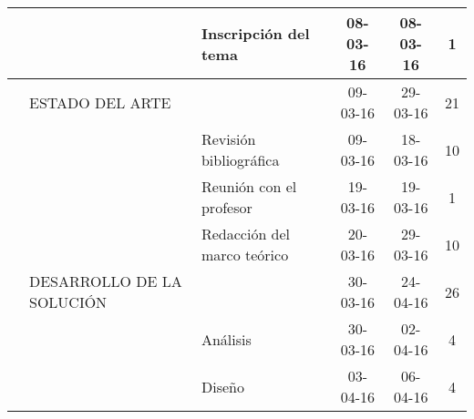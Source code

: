 \begin{table}[H]
{\begin{tabular}{lllccc}
     &                               & Inscripción del tema                               & 08-03-16                                                           & 08-03-16                                                            & 1                                                                  \\ \hline
     & ESTADO DEL ARTE               &                                                    & 09-03-16                                                           & 29-03-16                                                            & 21                                                                 \\
     &                               & Revisión bibliográfica                             & 09-03-16                                                           & 18-03-16                                                            & 10                                                                 \\
     &                               & Reunión con el profesor                            & 19-03-16                                                           & 19-03-16                                                            & 1                                                                  \\
     &                               & Redacción del marco teórico                        & 20-03-16                                                           & 29-03-16                                                            & 10                                                                 \\ \hline
     & DESARROLLO DE LA SOLUCIÓN     &                                                    & 30-03-16                                                           & 24-04-16                                                            & 26                                                                 \\
     &                               & Análisis                                           & 30-03-16                                                           & 02-04-16                                                            & 4                                                                  \\
     &                               & Diseño                                             & 03-04-16                                                           & 06-04-16                                                            & 4                                                                  \\

\end{tabular}}
\end{table}
